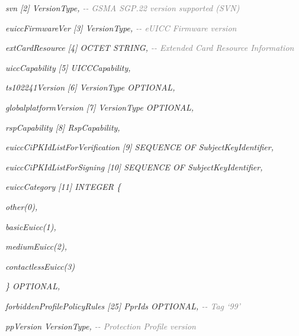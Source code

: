 \documentclass[10pt, oneside]{book}
\begin{document}
\hspace{0.75cm} \textit{svn [2] VersionType, \textcolor{gray}{{-}{-} GSMA SGP.22 version supported (SVN)}}

\hspace{0.75cm} \textit{euiccFirmwareVer [3] VersionType, \textcolor{gray}{{-}{-} eUICC Firmware version}}

\hspace{0.75cm} \textit{extCardResource [4] OCTET STRING, \textcolor{gray}{{-}{-} Extended Card Resource Information}}

\hspace{0.75cm} \textit{uiccCapability [5] UICCCapability,}

\hspace{0.75cm} \textit{ts102241Version [6] VersionType OPTIONAL,}

\hspace{0.75cm} \textit{globalplatformVersion [7] VersionType OPTIONAL,}

\hspace{0.75cm} \textit{rspCapability [8] RspCapability,}

\hspace{0.75cm} \textit{euiccCiPKIdListForVerification [9] SEQUENCE OF SubjectKeyIdentifier,}

\hspace{0.75cm} \textit{euiccCiPKIdListForSigning [10] SEQUENCE OF SubjectKeyIdentifier,}

\hspace{0.75cm} \textit{euiccCategory [11] INTEGER \{}

\hspace{1.5cm} \textit{other(0),}

\hspace{1.5cm} \textit{basicEuicc(1),}

\hspace{1.5cm} \textit{mediumEuicc(2),}

\hspace{1.5cm} \textit{contactlessEuicc(3)}

\hspace{0.75cm} \textit{\} OPTIONAL,}

\hspace{0.75cm} \textit{forbiddenProfilePolicyRules [25] PprIds OPTIONAL, \textcolor{gray}{{-}{-} Tag `99'}}

\hspace{0.75cm} \textit{ppVersion VersionType, \textcolor{gray}{{-}{-} Protection Profile version}}
\end{document}
